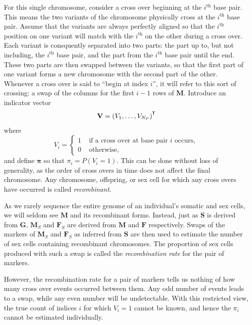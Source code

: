 \documentclass[sts]{imsart}
\newcommand{\ve}[1]{\mathbf{#1}}           %
\newcommand{\sv}[1]{\boldsymbol{#1}}   %
\newcommand{\m}[1]{\mathbf{#1}}               %
\newcommand{\tr}[1]{{#1}^{\mkern-1.5mu\mathsf{T}}}              %
\begin{document}
For this single chromosome, consider a cross over beginning at the $i^{\text{th}}$ base pair. This means the two variants of the chromosome physically cross at the $i^{\text{th}}$ base pair. Assume that the variants are always perfectly aligned so that the $i^{\text{th}}$ position on one variant will match with the $i^{\text{th}}$ on the other during a cross over. Each variant is consquently separated into two parts: the part up to, but not including, the $i^{\text{th}}$ base pair, and the part from the $i^{\text{th}}$ base pair until the end. These two parts are then swapped between the variants, so that the first part of one variant forms a new chromosome with the second part of the other. Whenever a cross over is said to ``begin at index $i$'', it will refer to this sort of crossing: a swap of the columns for the first $i-1$ rows of $\m{M}$. Introduce an indicator vector
$$\ve{V} = \tr{(V_1, \dots, V_{N_P})}$$
where
\begin{equation} \label{eq:crossindicator}
V_i = \begin{cases}
  1 & \text{ if a cross over at base pair } i \text{ occurs}, \\
  0 & \text{ otherwise},
\end{cases}
\end{equation}
and define $\sv{\pi}$ so that $\pi_i = P(V_i = 1)$. This can be done without loss of generality, as the order of cross overs in time does not affect the final chromosome. Any chromosome, offspring, or sex cell for which any cross overs have occurred is called \textit{recombinant}.

As we rarely sequence the entire genome of an individual's somatic and sex cells, we will seldom see $\m{M}$ and its recombinant forms. Instead, just as $\m{S}$ is derived from $\m{G}$, $\m{M}_S$ and $\m{F}_S$ are derived from $\m{M}$ and $\m{F}$ respectively. Swaps of the markers of $\m{M}_S$ and $\m{F}_S$ as inferred from $\m{S}$ are then used to estimate the number of sex cells containing recombinant chromosomes. The proportion of sex cells produced with such a swap is called the \textit{recombination rate} for the pair of markers.

However, the recombination rate for a pair of markers tells us nothing of how many cross over events occurred between them. Any odd number of events leads to a swap, while any even number will be undetectable. With this restricted view, the true count of indices $i$ for which $V_i = 1$ cannot be known, and hence the $\pi_i$ cannot be estimated individually.
\end{document}
